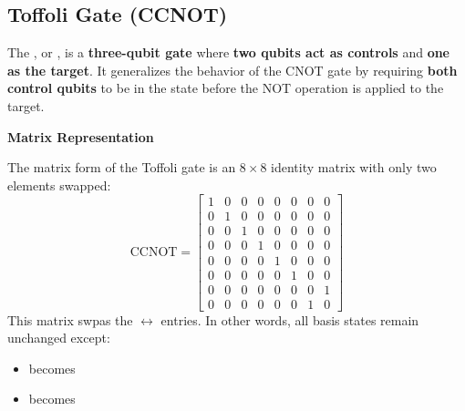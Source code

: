 \subsection{Toffoli Gate (CCNOT)}

The , or , is a \textbf{three-qubit gate} where \textbf{two qubits act as controls} and \textbf{one as the target}. It generalizes the behavior of the CNOT gate by requiring \textbf{both control qubits} to be in the state  before the NOT operation is applied to the target.

\highspace
\begin{flushleft}
    \textcolor{Green3}{ \textbf{Matrix Representation}}
\end{flushleft}
The matrix form of the Toffoli gate is an $8 \times 8$ identity matrix with only two elements swapped:
\begin{equation*}
    \text{CCNOT} = \begin{bmatrix}
        1 & 0 & 0 & 0 & 0 & 0 & 0 & 0 \\
        0 & 1 & 0 & 0 & 0 & 0 & 0 & 0 \\
        0 & 0 & 1 & 0 & 0 & 0 & 0 & 0 \\
        0 & 0 & 0 & 1 & 0 & 0 & 0 & 0 \\
        0 & 0 & 0 & 0 & 1 & 0 & 0 & 0 \\
        0 & 0 & 0 & 0 & 0 & 1 & 0 & 0 \\
        0 & 0 & 0 & 0 & 0 & 0 & 0 & 1 \\
        0 & 0 & 0 & 0 & 0 & 0 & 1 & 0
    \end{bmatrix}
\end{equation*}
This matrix swpas the  $\leftrightarrow$  entries. In other words, all basis states remain unchanged except:
\begin{itemize}
    \item {} becomes 
    \item {} becomes 
\end{itemize}

